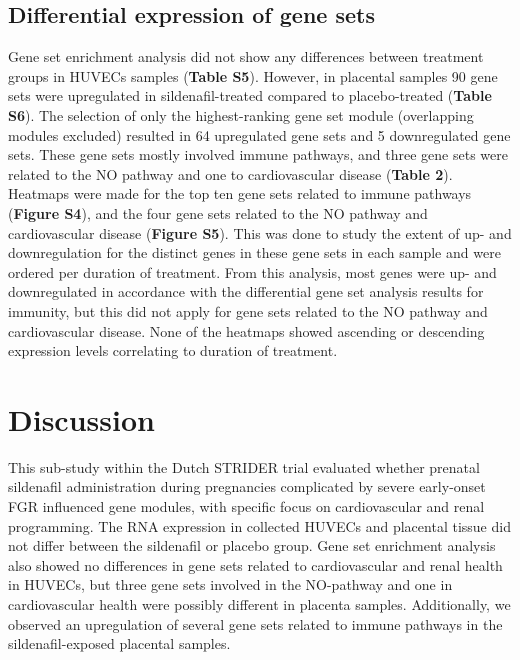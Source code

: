 \documentclass[authordate, empirical]{jote-new-article}
\begin{document}
	\subsection{Differential expression of gene sets}



	Gene set enrichment analysis did not show any differences between treatment groups in HUVECs samples (\textbf{Table S5}). However, in placental samples 90 gene sets were upregulated in sildenafil-treated compared to placebo-treated (\textbf{Table S6}). The selection of only the highest-ranking gene set module (overlapping modules excluded) resulted in 64 upregulated gene sets and 5 downregulated gene sets. These gene sets mostly involved immune pathways, and three gene sets were related to the NO pathway and one to cardiovascular disease (\textbf{Table 2}). Heatmaps were made for the top ten gene sets related to immune pathways (\textbf{Figure S4}), and the four gene sets related to the NO pathway and cardiovascular disease (\textbf{Figure S5}). This was done to study the extent of up- and downregulation for the distinct genes in these gene sets in each sample and were ordered per duration of treatment. From this analysis, most genes were up- and downregulated in accordance with the differential gene set analysis results for immunity, but this did not apply for gene sets related to the NO pathway and cardiovascular disease. None of the heatmaps showed ascending or descending expression levels correlating to duration of treatment.















	\section{Discussion}







	This sub-study within the Dutch STRIDER trial evaluated whether prenatal sildenafil administration during pregnancies complicated by severe early-onset FGR influenced gene modules, with specific focus on cardiovascular and renal programming. The RNA expression in collected HUVECs and placental tissue did not differ between the sildenafil or placebo group. Gene set enrichment analysis also showed no differences in gene sets related to cardiovascular and renal health in HUVECs, but three gene sets involved in the NO-pathway and one in cardiovascular health were possibly different in placenta samples. Additionally, we observed an upregulation of several gene sets related to immune pathways in the sildenafil-exposed placental samples.
\end{document}
